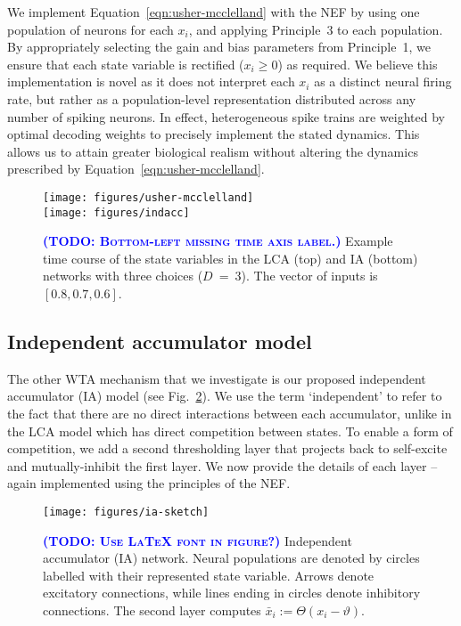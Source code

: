 \documentclass[10pt,letterpaper]{article}
\makeatletter
\newcommand{\todo}[1]{\textbf{\textsc{\textcolor{blue}{(TODO\@: #1)}}}}
\makeatother
\begin{document}
We implement Equation~\ref{eqn:usher-mcclelland} with the NEF by using one population of neurons for each $x_i$, and applying Principle~3 to each population.
By appropriately selecting the gain and bias parameters from Principle~1, we ensure that each state variable is rectified ($x_i \ge 0$) as required.
We believe this implementation is novel as it does not interpret each $x_i$ as a distinct neural firing rate, but rather as a population-level representation distributed across any number of spiking neurons.
In effect, heterogeneous spike trains are weighted by optimal decoding weights to precisely implement the stated dynamics.
This allows us to attain greater biological realism without altering the dynamics prescribed by Equation~\ref{eqn:usher-mcclelland}.
\begin{figure}[t]
    \centering
    \texttt{[image: figures/usher-mcclelland]}\\
    \vspace*{.3cm}
    \texttt{[image: figures/indacc]}
    \caption{
        \todo{Bottom-left missing time axis label.}
        Example time course of the state variables in the LCA (top) and IA (bottom) networks with three choices ($D~=~3$).
        The vector of inputs is $\left[ 0.8, 0.7, 0.6 \right]$.
    }\label{fig:usher-mcclelland}\label{fig:indacc}
\end{figure}

\subsection{Independent accumulator model}
The other WTA mechanism that we investigate is our proposed independent accumulator (IA) model (see Fig.~\ref{fig:ia-sketch}).
We use the term `independent' to refer to the fact that there are no direct interactions between each accumulator, unlike in the LCA model which has direct competition between states.
To enable a form of competition, we add a second thresholding layer that  projects back to self-excite and mutually-inhibit the first layer.
We now provide the details of each layer -- again implemented using the principles of the NEF\@.
\begin{figure}
    \centering
    \texttt{[image: figures/ia-sketch]}
    \caption{
        \todo{Use LaTeX font in figure?}
        Independent accumulator (IA) network.
        Neural populations are denoted by circles labelled with their represented state variable.
        Arrows denote excitatory connections, while lines ending in circles denote inhibitory connections.
        The second layer computes $\bar{x}_i := \Theta(x_i - \vartheta)$.
    }\label{fig:ia-sketch}
\end{figure}
\end{document}
